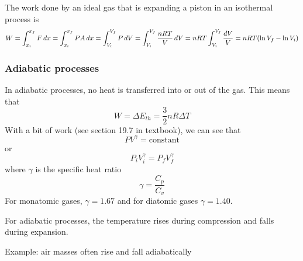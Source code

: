 The work done by an ideal gas that is expanding a piston in an isothermal process is
$$W=\displaystyle\int_{x_i}^{x_f}F\,dx=\int_{x_i}^{x_f}PA\,dx=\int_{V_i}^{V_f}P\,dV=\int_{V_i}^{V_f}\frac{nRT}{V}\,dV=nRT\int_{V_i}^{V_f}\frac{dV}{V}=nRT(\ln V_f-\ln V_i)$$

\subsubsection{Adiabatic processes}
In adiabatic processes, no heat is transferred into or out of the gas. This means that
$$W=\Delta{E_{th}}=\frac{3}{2}nR\Delta{T}$$
With a bit of work (see section 19.7 in textbook), we can see that
$$PV^\gamma=\mbox{constant}$$
or
$$P_iV_i^\gamma=P_fV_f^\gamma$$
where $\gamma$ is the specific heat ratio
$$\gamma = \frac{C_p}{C_v}$$
For monatomic gases, $\gamma=1.67$ and for diatomic gases $\gamma=1.40$.

For adiabatic processes, the temperature rises during compression and falls during expansion.

Example: air masses often rise and fall adiabatically

\clearpage
